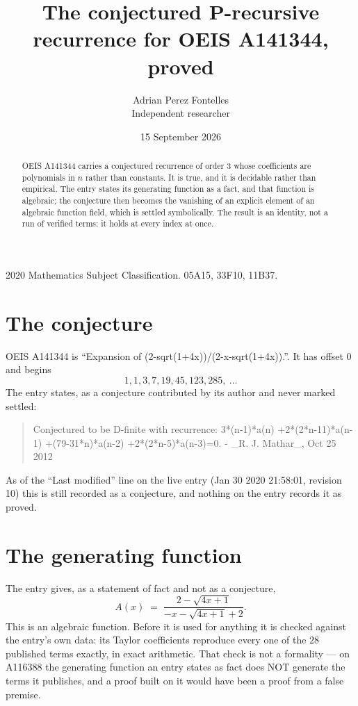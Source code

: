 \documentclass[11pt,a4paper]{article}
\title{The conjectured P-recursive recurrence for OEIS A141344, proved}
\author{Adrian Perez Fontelles\\ \small Independent researcher}
\date{15 September 2026}
\theoremstyle{plain}
\theoremstyle{definition}
\begin{document}
\maketitle

\begin{abstract}
OEIS A141344 carries a conjectured recurrence of order $3$ whose coefficients are polynomials in
$n$ rather than constants. It is true, and it is decidable rather than empirical. The entry
states its generating function as a fact, and that function is algebraic; the conjecture then
becomes the vanishing of an explicit element of an algebraic function field, which is settled
symbolically. The result is an identity, not a run of verified terms: it holds at every index
at once.
\end{abstract}

\noindent\small 2020 Mathematics Subject Classification. 05A15, 33F10, 11B37.\normalsize

\section{The conjecture}

OEIS A141344 is ``Expansion of (2-sqrt(1+4x))/(2-x-sqrt(1+4x)).''. It has offset $0$ and begins
\[
1, 1, 3, 7, 19, 45, 123, 285,\ \dots
\]
The entry states, as a conjecture contributed by its author and never marked settled:
\begin{quote}\raggedright\small
Conjectured to be D-finite with recurrence: 3*(n-1)*a(n) +2*(2*n-11)*a(n-1) +(79-31*n)*a(n-2) +2*(2*n-5)*a(n-3)=0. - \_R. J. Mathar\_, Oct 25 2012
\end{quote}
As of the ``Last modified'' line on the live entry (Jan 30 2020 21:58:01, revision 10)
this is still recorded as a conjecture, and nothing on the entry records it as proved.

\section{The generating function}

The entry gives, as a statement of fact and not as a conjecture,
\[
A(x)\;=\;\frac{2 - \sqrt{4 x + 1}}{- x - \sqrt{4 x + 1} + 2} .
\]
This is an algebraic function. Before it is used for anything it is checked against the entry's
own data: its Taylor coefficients reproduce every one of the $28$ published terms
exactly, in exact arithmetic. That check is not a formality --- on A116388 the generating
function an entry states as fact does NOT generate the terms it publishes, and a proof built on
it would have been a proof from a false premise.
\end{document}
